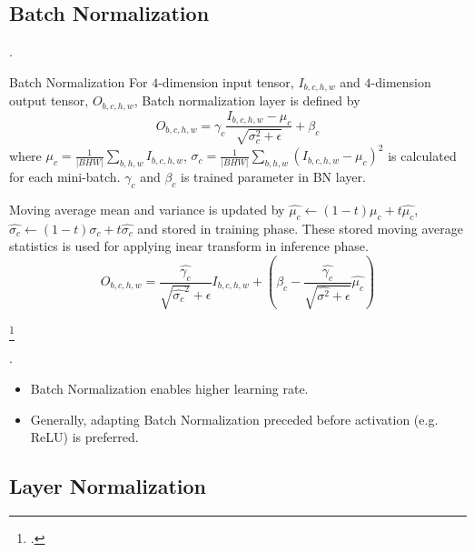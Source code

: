 \documentclass[8pt]{beamer}
\newcommand{\abs}[1]{\left\lvert #1 \right\rvert}
\begin{document}
\subsection{Batch Normalization}


\begin{frame}{.}

    \begin{block}{Batch Normalization}
        For $4$-dimension input tensor, $I_{b,c,h,w}$ and $4$-dimension output tensor, $O_{b,c,h,w}$, Batch normalization layer is defined by
        \[
            O_{b,c,h,w} = \gamma_c \frac{I_{b,c,h,w} - \mu_c}{\sqrt{\sigma^2_c + \epsilon}} + \beta_c
        \]
        where $\mu_c = \frac{1}{\abs{BHW} } \sum_{b,h,w} I_{b,c,h,w}$, $\sigma_c = \frac{1}{\abs{BHW}} \sum_{b,h,w} (I_{b,c,h,w} - \mu_c)^2$ is calculated for each mini-batch. $\gamma_c$ and $\beta_c$ is trained parameter in BN layer.

        \smallskip
        Moving average mean and variance is updated by $\hat{\mu_c} \leftarrow (1-t)\mu_c + t\hat{\mu_c}$, $\hat{\sigma_c} \leftarrow (1-t) \sigma_c + t \hat{\sigma_c}$ and stored in training phase. These stored moving average statistics is used for applying inear transform in inference phase.
        \[
            O_{b,c,h,w} = \frac{\hat{\gamma_c}}{\sqrt{\hat{\sigma_c}^2}+ \epsilon} I_{b,c,h,w} + \left(\beta_c  - \frac{\hat{\gamma_c}}{\sqrt{\hat{\sigma^2} + \epsilon}}\hat{\mu_c}\right)
        \]
    \end{block}


    \footcite{Understanding_Batch_Normalization_nips_2018,ioffe2015batch}
\end{frame}

\begin{frame}{.}
    \begin{itemize}
        \item Batch Normalization enables higher learning rate.
        \item Generally, adapting Batch Normalization preceded before activation (e.g. ReLU) is preferred.
    \end{itemize}
\end{frame}

\subsection{Layer Normalization}
\end{document}
